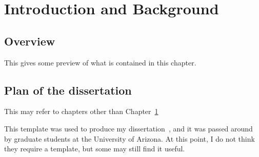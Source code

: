 
\chapter{Introduction and Background}
\label{ch:background}

\section*{Overview}
This gives some preview of what is contained in this chapter. 




\section{Plan of the dissertation}
This may refer to chapters other than Chapter~\ref{ch:background}

This template was used to produce my dissertation~\citep{D16}, 
and it was passed around by graduate students at the University of Arizona. At this point, I do not think they require a template,
but some may still find it useful. 

